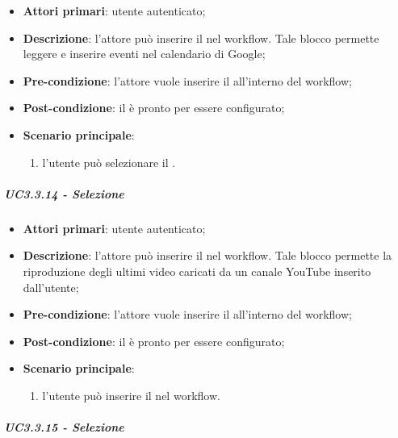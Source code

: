 \begin{itemize}
\item \textbf{Attori primari}: utente autenticato;

\item \textbf{Descrizione}: l'attore può inserire il \BCalendario{} nel workflow. Tale blocco permette leggere e inserire eventi nel calendario di Google;

\item \textbf{Pre-condizione}: l'attore vuole inserire il \BCalendario{} all'interno del workflow;

\item \textbf{Post-condizione}: il \BCalendario{} è pronto per essere configurato;

\item \textbf{Scenario principale}:
\begin{enumerate}
\item l'utente può selezionare il \BCalendario{}.

\end{enumerate}
\end{itemize}

\subparagraph{UC3.3.14 - Selezione \BYouTube{}}

\begin{itemize}
\item \textbf{Attori primari}: utente autenticato;

\item \textbf{Descrizione}: l'attore può inserire il \BYouTube{} nel workflow. Tale blocco permette la riproduzione degli ultimi video caricati da un canale YouTube inserito dall'utente;

\item \textbf{Pre-condizione}: l'attore vuole inserire il \BYouTube{} all'interno del workflow;

\item \textbf{Post-condizione}: il \BYouTube{} è pronto per essere configurato;

\item \textbf{Scenario principale}:
\begin{enumerate}
\item  l'utente può inserire il \BYouTube{} nel workflow.

\end{enumerate}
\end{itemize}

\subparagraph{UC3.3.15 - Selezione \BYouTubeMusic{}}

